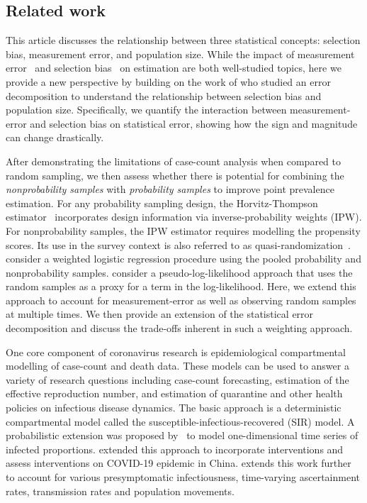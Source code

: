 \documentclass[11pt]{amsart}
\numberwithin{equation}{section}
\theoremstyle{plain}
\begin{document}
 \subsection{Related work}

 This article discusses the relationship between three statistical concepts: selection bias, measurement error, and population size.  While the impact of measurement error~\citep{Smeden2019} and selection bias~\citep{Keiding2016} on estimation are both well-studied topics, here we provide a new perspective by building on the work of \cite{Meng2018} who studied an error decomposition to understand the relationship between selection bias and population size.  Specifically, we quantify the interaction between measurement-error and selection bias on statistical error, showing how the sign and magnitude can change drastically.


 After demonstrating the limitations of case-count analysis when compared to random sampling, we then assess whether there is potential for combining the \emph{nonprobability samples} with \emph{probability samples} to improve point prevalence estimation. For any probability sampling design, the Horvitz-Thompson estimator~\citep{HT1952} incorporates design information via inverse-probability weights (IPW).  For nonprobability samples, the IPW estimator requires modelling the propensity scores.  Its use in the survey context is also referred to as quasi-randomization~\citep{Elliott2017}. \cite{Valliant2011} consider a weighted logistic regression procedure using the pooled probability and nonprobability samples.  \cite{Chen2019} consider a pseudo-log-likelihood approach that uses the random samples as a proxy for a term in the log-likelihood.  Here, we extend this approach to account for measurement-error as well as observing random samples at multiple times. We then provide an extension of the statistical error decomposition and discuss the trade-offs inherent in such a weighting approach.

 One core component of coronavirus research is epidemiological compartmental modelling of case-count and death data. These models can be used to answer a variety of research questions including case-count forecasting, estimation of the effective reproduction number, and estimation of quarantine and other health policies on infectious disease dynamics.  The basic approach is a deterministic compartmental model called the susceptible-infectious-recovered (SIR) model.  A probabilistic extension was proposed by~\cite{Osthus2017} to model one-dimensional time series of infected proportions. \cite{Song2020} extended this approach to incorporate interventions and assess interventions on COVID-19 epidemic in China. \cite{Hao2020} extends this work further to account for various presymptomatic infectiousness, time-varying ascertainment rates, transmission rates and population movements.
\end{document}
